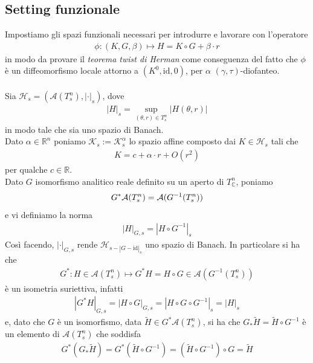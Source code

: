 \documentclass[twoside, 11pt]{amsbook}
\newcommand{\0}{{(0)}}
\newcommand{\3}{{(3)}}
\theoremstyle{colonplain}
\theoremstyle{colondefinition}
\theoremstyle{colonremark}
\numberwithin{equation}{chapter}
\begin{document}
\subsection{Setting funzionale}\label{SettingFunz}
Impostiamo gli spazi funzionali necessari per introdurre e lavorare con l'operatore
\begin{align}
    \phi : (K, G, \beta) \mapsto H = K \circ G + \beta \cdot r 
\end{align}
in modo da provare il \textit{teorema twist di Herman} come conseguenza del fatto che $\phi$ è un diffeomorfismo locale attorno a $(K^0, \mathrm{id}, 0)$, per $\alpha$ $(\gamma, \tau)$-diofanteo. \\ \\
Sia $\mathcal{H}_s = (\mathcal{A}(T^n_s), |\cdot|_s)$, dove
\begin{align}
    |H|_s = \sup_{(\theta, r) \in T^n_s} |H(\theta, r)| 
\end{align}
in modo tale che sia uno spazio di Banach. \\
Dato $\alpha \in \mathbb{R}^n$ poniamo $\mathcal{K}_s := \mathcal{K}^\alpha_s$ lo spazio affine composto dai $K \in \mathcal{H}_s$ tali che
\begin{align}
    K = c + \alpha \cdot r + O(r^2) 
\end{align}
per qualche $c \in \mathbb{R}$. \\
Dato $G$ isomorfismo analitico reale definito su un aperto di $T^n_{\mathbb{C}}$, poniamo
\begin{align}
    G^*\mathcal{A}(T^n_s) = \mathcal{A}(G^{-1}(T^n_s)) \notag
\end{align}
e vi definiamo la norma
\begin{align}
    |H|_{G, s} = |H \circ G^{-1}|_s 
\end{align}
Così facendo, $|\cdot|_{G, s}$ rende $\mathcal{H}_{s - |G - \mathrm{id}|_s}$ uno spazio di Banach. In particolare si ha che
\begin{align}
    G^* : H \in \mathcal{A}(T^n_s) \mapsto G^*H = H \circ G \in \mathcal{A}(G^{-1}(T^n_s)) 
\end{align}
è un isometria suriettiva, infatti
\begin{align}
    |G^*H|_{G, s} = |H \circ G|_{G, s} = |H \circ G \circ G^{-1}|_s = |H|_s
\end{align}
e, dato che $G$ è un isomorfismo, data $\widetilde{H} \in G^*\mathcal{A}(T^n_s)$, si ha che $G_*\widetilde{H} = \widetilde{H} \circ G^{-1}$ è un elemento di $\mathcal{A}(T^n_s)$ che soddisfa
\begin{align}
    G^*(G_*\widetilde{H}) = G^*(\widetilde{H} \circ G^{-1}) = (\widetilde{H} \circ G^{-1}) \circ G = \widetilde{H}
\end{align}
\end{document}
